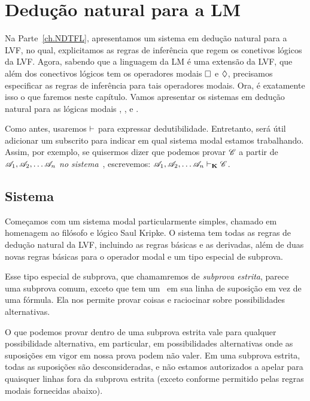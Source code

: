 \chapter{Dedução natural para a LM}
\label{Proof}

Na Parte~\ref{ch.NDTFL},  apresentamos um sistema em dedução natural para a LVF, no qual, explicitamos as regras de inferência que regem os conetivos lógicos da  LVF.  Agora, sabendo que a linguagem da LM é uma extensão da LVF,  que além dos conectivos lógicos tem os operadores modais   $\Box$ e $\Diamond$,  precisamos especificar as regras de inferência para tais operadores modais. Ora, é exatamente isso o que faremos neste capítulo. Vamos apresentar os sistemas em dedução  natural  para as lógicas modais  \mlK, \mlT, \mlSfour{} e \mlSfive.

 Como  antes,  usaremos $\vdash$ para expressar dedutibilidade. Entretanto, será útil adicionar um subscrito para indicar em qual sistema modal estamos trabalhando. Assim,  por exemplo, se quisermos dizer que podemos provar $\mathscr{C}$ a partir de $\mathscr{A}_1,\mathscr{A}_2, \dots \mathscr{A}_n$ \emph{no sistema}~\mlK, escrevemos: $\mathscr{A}_1,\mathscr{A}_2, \dots \mathscr{A}_n \vdash_{\mathbf{K}} \mathscr{C}$.

\section{Sistema \mlK}
\label{K}

Começamos com um sistema modal particularmente simples, chamado \mlK{} em homenagem ao filósofo e lógico Saul Kripke. O sistema \mlK{} tem todas as regras de dedução natural da  LVF, incluindo as regras  básicas e as derivadas, além de  duas novas regras básicas para o operador modal   \ebox{}  e um tipo especial de subprova.   


Esse  tipo especial de subprova, que chamamremos de  \emph{subprova estrita}, parece uma subprova comum, exceto que tem um~\ebox{} em sua linha de suposição em vez de uma fórmula. Ela nos permite provar coisas e raciocinar sobre possibilidades alternativas. 
 
 O que podemos provar dentro de uma subprova estrita vale para qualquer possibilidade alternativa, em particular, em possibilidades alternativas onde as suposições em vigor em nossa prova podem não valer. Em uma subprova estrita, todas as suposições são desconsideradas, e não estamos autorizados a apelar para quaisquer linhas fora da subprova estrita (exceto conforme permitido pelas regras modais fornecidas abaixo).


